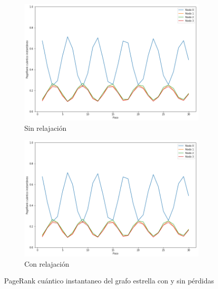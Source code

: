 \begin{figure}[H]
    \centering
    \begin{subfigure}[m]{0.45\textwidth}
        \centering
        \includegraphics[width=0.9\linewidth]{img/star-inst-lossless.png}
        \caption{Sin relajación}
    \end{subfigure}
    \begin{subfigure}[m]{0.45\textwidth}
        \centering
        \includegraphics[width=0.9\linewidth]{img/star-inst-lossy.png}
        \caption{Con relajación}
    \end{subfigure}
    \caption[PageRank cuántico instantaneo del grafo estrella con y sin pérdidas]{PageRank cuántico instantaneo del grafo estrella con y sin pérdidas}
    \label{fig:inststarlossy}
\end{figure}

